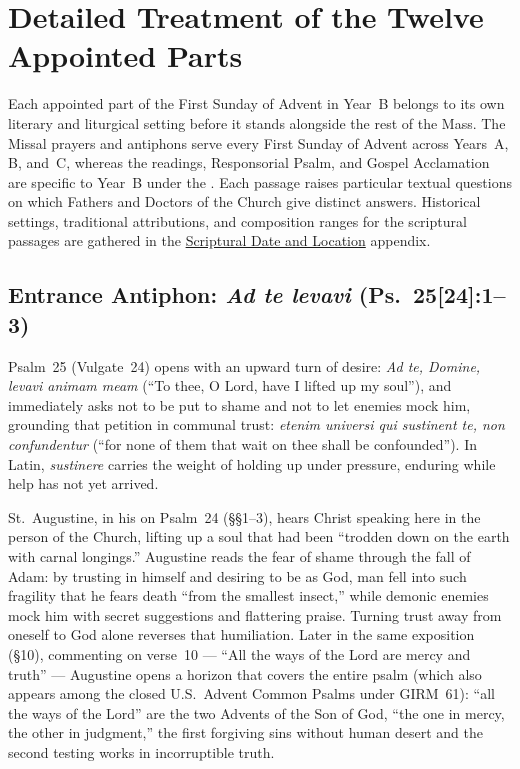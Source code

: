 \section{Detailed Treatment of the Twelve Appointed Parts}

Each appointed part of the First Sunday of Advent in Year~B belongs to its own literary and liturgical setting before it stands alongside the rest of the Mass. The Missal prayers and antiphons serve every First Sunday of Advent across Years~A, B, and~C, whereas the readings, Responsorial Psalm, and Gospel Acclamation are specific to Year~B under the . Each passage raises particular textual questions on which Fathers and Doctors of the Church give distinct answers. Historical settings, traditional attributions, and composition ranges for the scriptural passages are gathered in the \hyperref[sec:date-location]{Scriptural Date and Location} appendix.

\subsection{Entrance Antiphon: \emph{Ad te levavi} (Ps.~25[24]:1--3)}

Psalm~25 (Vulgate~24) opens with an upward turn of desire: \emph{Ad te, Domine, levavi animam meam} (``To thee, O Lord, have I lifted up my soul''), and immediately asks not to be put to shame and not to let enemies mock him, grounding that petition in communal trust: \emph{etenim universi qui sustinent te, non confundentur} (``for none of them that wait on thee shall be confounded''). In Latin, \emph{sustinere} carries the weight of holding up under pressure, enduring while help has not yet arrived.

St.~Augustine, in his  on Psalm~24 (§§1--3), hears Christ speaking here in the person of the Church, lifting up a soul that had been ``trodden down on the earth with carnal longings.'' Augustine reads the fear of shame through the fall of Adam: by trusting in himself and desiring to be as God, man fell into such fragility that he fears death ``from the smallest insect,'' while demonic enemies mock him with secret suggestions and flattering praise. Turning trust away from oneself to God alone reverses that humiliation. Later in the same exposition (§10), commenting on verse~10 --- ``All the ways of the Lord are mercy and truth'' --- Augustine opens a horizon that covers the entire psalm (which also appears among the closed U.S.\ Advent Common Psalms under GIRM~61): ``all the ways of the Lord'' are the two Advents of the Son of God, ``the one in mercy, the other in judgment,'' the first forgiving sins without human desert and the second testing works in incorruptible truth.

